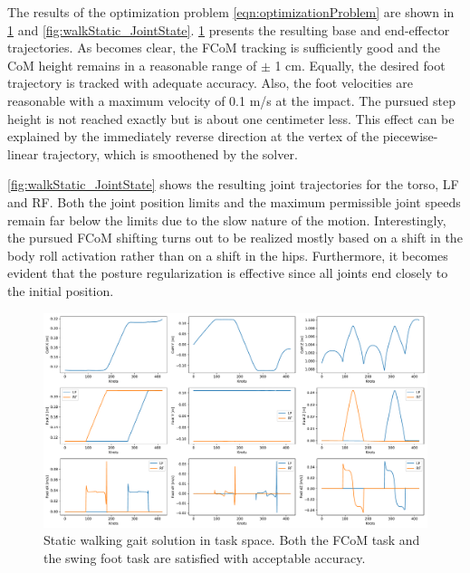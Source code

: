 The results of the optimization problem \cref{eqn:optimizationProblem} are shown in \cref{fig:walkStatic_TaskSpace} and \cref{fig:walkStatic_JointState}.
\cref{fig:walkStatic_TaskSpace} presents the resulting base and end-effector trajectories. As becomes clear, the \gls{FCoM} tracking is sufficiently good and the \gls{CoM} height remains in a reasonable range of $\pm$ 1 cm. Equally, the desired foot trajectory is tracked with adequate accuracy. Also, the foot velocities are reasonable with a maximum velocity of 0.1 m/s at the impact. The pursued step height is not reached exactly but is about one centimeter less. This effect can be explained by the immediately reverse direction at the vertex of the piecewise-linear trajectory, which is smoothened by the solver.

\cref{fig:walkStatic_JointState} shows the resulting joint trajectories for the torso, \gls{LF} and \gls{RF}. Both the joint position limits and the maximum permissible joint speeds remain far below the limits due to the slow nature of the motion. Interestingly, the pursued \gls{FCoM} shifting turns out to be realized mostly based on a shift in the body roll activation rather than on a shift in the hips. Furthermore, it becomes evident that the posture regularization is effective since all joints end closely to the initial position.

\begin{figure}[h!]
\centering	
\includegraphics[width=1\textwidth]{fig/walkStatic/TaskSpace}
\caption[Static walking gait solution in task space]{Static walking gait solution in task space. Both the \gls{FCoM} task and the swing foot task are satisfied with acceptable accuracy.}
\label{fig:walkStatic_TaskSpace}
\end{figure} 

